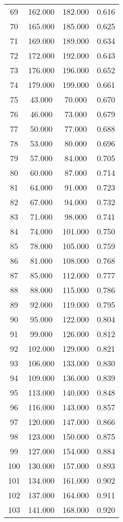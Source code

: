 \begin{tabular}{cccc}
  69 & 162.000 & 182.000 & 0.616 \\ 
  70 & 165.000 & 185.000 & 0.625 \\ 
  71 & 169.000 & 189.000 & 0.634 \\ 
  72 & 172.000 & 192.000 & 0.643 \\ 
  73 & 176.000 & 196.000 & 0.652 \\ 
  74 & 179.000 & 199.000 & 0.661 \\ 
  75 & 43.000 & 70.000 & 0.670 \\ 
  76 & 46.000 & 73.000 & 0.679 \\ 
  77 & 50.000 & 77.000 & 0.688 \\ 
  78 & 53.000 & 80.000 & 0.696 \\ 
  79 & 57.000 & 84.000 & 0.705 \\ 
  80 & 60.000 & 87.000 & 0.714 \\ 
  81 & 64.000 & 91.000 & 0.723 \\ 
  82 & 67.000 & 94.000 & 0.732 \\ 
  83 & 71.000 & 98.000 & 0.741 \\ 
  84 & 74.000 & 101.000 & 0.750 \\ 
  85 & 78.000 & 105.000 & 0.759 \\ 
  86 & 81.000 & 108.000 & 0.768 \\ 
  87 & 85.000 & 112.000 & 0.777 \\ 
  88 & 88.000 & 115.000 & 0.786 \\ 
  89 & 92.000 & 119.000 & 0.795 \\ 
  90 & 95.000 & 122.000 & 0.804 \\ 
  91 & 99.000 & 126.000 & 0.812 \\ 
  92 & 102.000 & 129.000 & 0.821 \\ 
  93 & 106.000 & 133.000 & 0.830 \\ 
  94 & 109.000 & 136.000 & 0.839 \\ 
  95 & 113.000 & 140.000 & 0.848 \\ 
  96 & 116.000 & 143.000 & 0.857 \\ 
  97 & 120.000 & 147.000 & 0.866 \\ 
  98 & 123.000 & 150.000 & 0.875 \\ 
  99 & 127.000 & 154.000 & 0.884 \\ 
  100 & 130.000 & 157.000 & 0.893 \\ 
  101 & 134.000 & 161.000 & 0.902 \\ 
  102 & 137.000 & 164.000 & 0.911 \\ 
  103 & 141.000 & 168.000 & 0.920 \\ 

\end{tabular}
